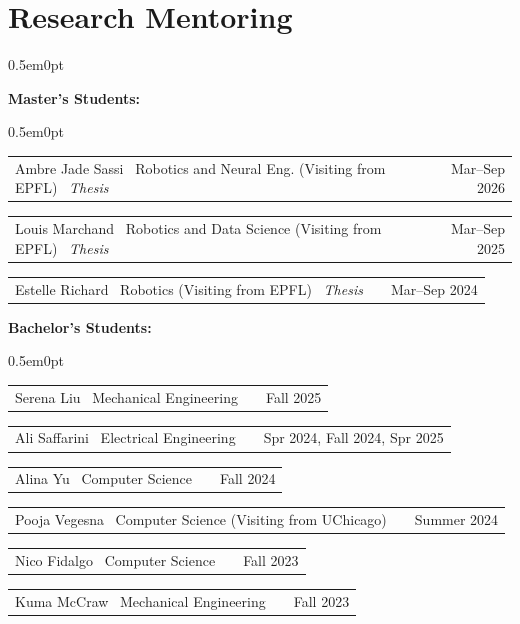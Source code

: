 \documentclass[letterpaper,11pt]{article}
\makeatletter
\newenvironment{mentee}[2]
    {
    \begin{tabularx}{\linewidth}{@{}l X r@{}}
    #1 & \hfill &  #2 \\[3pt]
    \end{tabularx}
    }
    {
    }
\makeatother
\begin{document}
\vspace{-12pt}
\section{Research Mentoring}
\begin{adjustwidth}{0.5em}{0pt}

\textbf{Master's Students:}
\begin{adjustwidth}{0.5em}{0pt}

\begin{mentee}{Ambre Jade Sassi \textbar\ Robotics and Neural Eng. (Visiting from EPFL) \textbar\ \textit{Thesis}}{Mar–Sep 2026}
\end{mentee}
\begin{mentee}{Louis Marchand \textbar\ Robotics and Data Science (Visiting from EPFL) \textbar\ \textit{Thesis}}{Mar–Sep 2025}
\end{mentee}
\begin{mentee}{Estelle Richard \textbar\ Robotics (Visiting from EPFL) \textbar\ \textit{Thesis}}{Mar–Sep 2024}
\end{mentee}

\end{adjustwidth}

\vspace{-16pt}
\textbf{Bachelor's Students:}
\begin{adjustwidth}{0.5em}{0pt}

\begin{mentee}{Serena Liu \textbar\ Mechanical Engineering}{Fall 2025}
\end{mentee}
\begin{mentee}{Ali Saffarini \textbar\ Electrical Engineering}{Spr 2024, Fall 2024, Spr 2025}
\end{mentee}
\begin{mentee}{Alina Yu \textbar\ Computer Science}{Fall 2024}
\end{mentee}
\begin{mentee}{Pooja Vegesna \textbar\ Computer Science (Visiting from UChicago)}{Summer 2024}
\end{mentee}
\begin{mentee}{Nico Fidalgo \textbar\ Computer Science}{Fall 2023}
\end{mentee}
\begin{mentee}{Kuma McCraw \textbar\ Mechanical Engineering}{Fall 2023}
\end{mentee}

\end{adjustwidth}

\end{adjustwidth}
\end{document}
